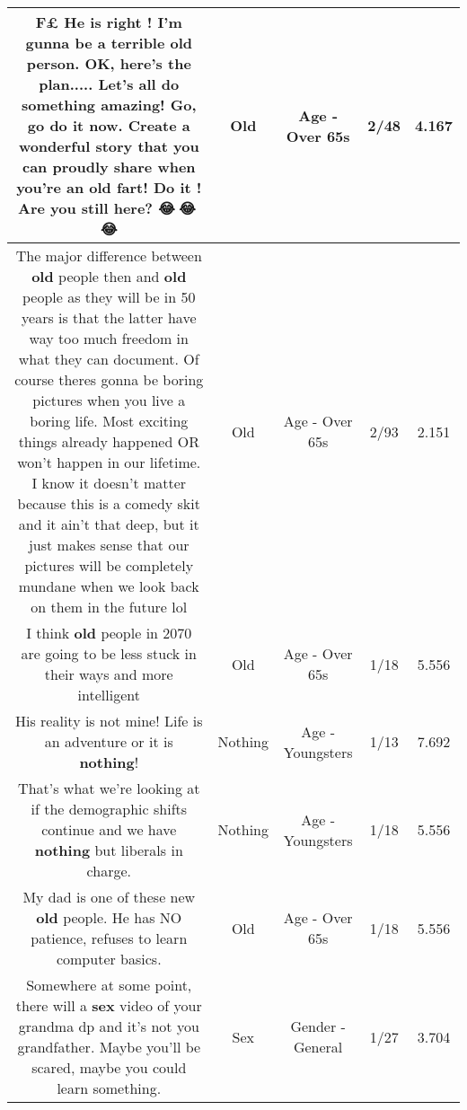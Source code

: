 \documentclass[11pt]{article}
\newlength\mylength
\begin{document}
\begin{center}
\begin{longtable}{|C{.65\mylength}|C{.30\mylength}|C{.12\mylength}|C{.12\mylength}|C{.12\mylength}|}
  \small F\@£ He is right ! I'm gunna be a terrible \textbf{old} person. OK, here's the plan..... Let's all do something amazing! Go, go do it now. Create a wonderful story that you can proudly share when you're an \textbf{old} fart! Do it ! Are you still here? 😂🤣😂🤣😂\normalsize   & Old & Age - Over 65s & 2/48 & 4.167 \\  \hline
  \small The major difference between \textbf{old} people then and \textbf{old} people as they will be in 50 years is that the latter have way too much freedom in what they can document. Of course theres gonna be boring pictures when you live a boring life. Most exciting things already happened OR won't happen in our lifetime. I know it doesn't matter because this is a comedy skit and it ain't that deep, but it just makes sense that our pictures will be completely mundane when we look back on them in the future lol\normalsize   & Old & Age - Over 65s & 2/93 & 2.151 \\  \hline
  \small I think \textbf{old} people in 2070 are going to be less stuck in their ways and more intelligent\normalsize   & Old & Age - Over 65s & 1/18 & 5.556 \\  \hline
  \small His reality is not mine! Life is an adventure or it is \textbf{nothing}!\normalsize   & Nothing & Age - Youngsters & 1/13 & 7.692 \\  \hline
  \small That's what we're looking at if the demographic shifts continue and we have \textbf{nothing} but liberals in charge.\normalsize   & Nothing & Age - Youngsters & 1/18 & 5.556 \\  \hline
  \small My dad is one of these new \textbf{old} people. He has NO patience, refuses to learn computer basics.\normalsize   & Old & Age - Over 65s & 1/18 & 5.556 \\  \hline
  \small Somewhere at some point, there will a \textbf{sex} video of your grandma dp and it's not you grandfather. Maybe you'll be scared, maybe you could learn something.\normalsize   & Sex & Gender - General & 1/27 & 3.704 \\  \hline

\end{longtable}
\end{center}
\end{document}
